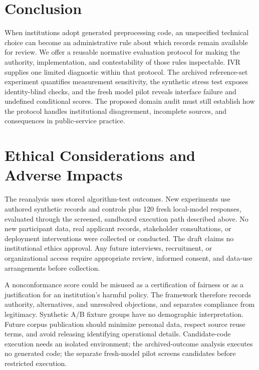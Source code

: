 \documentclass[manuscript,screen,review,anonymous]{acmart}
\begin{document}
\section{Conclusion}
When institutions adopt generated preprocessing code, an unspecified technical choice can become an administrative rule about which records remain available for review. We offer a reusable normative evaluation protocol for making the authority, implementation, and contestability of those rules inspectable. IVR supplies one limited diagnostic within that protocol. The archived reference-set experiment quantifies measurement sensitivity, the synthetic stress test exposes identity-blind checks, and the fresh model pilot reveals interface failure and undefined conditional scores. The proposed domain audit must still establish how the protocol handles institutional disagreement, incomplete sources, and consequences in public-service practice.

\section*{Ethical Considerations and Adverse Impacts}
The reanalysis uses stored algorithm-test outcomes. New experiments use authored synthetic records and controls plus 120 fresh local-model responses, evaluated through the screened, sandboxed execution path described above. No new participant data, real applicant records, stakeholder consultations, or deployment interventions were collected or conducted. The draft claims no institutional ethics approval. Any future interviews, recruitment, or organizational access require appropriate review, informed consent, and data-use arrangements before collection.

A nonconformance score could be misused as a certification of fairness or as a justification for an institution's harmful policy. The framework therefore records authority, alternatives, and unresolved objections, and separates compliance from legitimacy. Synthetic A/B fixture groups have no demographic interpretation. Future corpus publication should minimize personal data, respect source reuse terms, and avoid releasing identifying operational details. Candidate-code execution needs an isolated environment; the archived-outcome analysis executes no generated code; the separate fresh-model pilot screens candidates before restricted execution.
\end{document}
